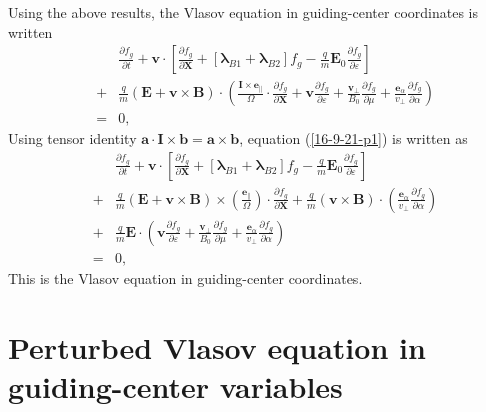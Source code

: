 \documentclass{llncs}
\newcommand{\tmmathbf}[1]{\ensuremath{\boldsymbol{#1}}}
\begin{document}
Using the above results, the Vlasov equation in guiding-center coordinates is
written
\begin{eqnarray}
  &  & \frac{\partial f_g}{\partial t} +\mathbf{v} \cdot \left[
  \frac{\partial f_g}{\partial \mathbf{X}} + [\tmmathbf{\lambda}_{B 1}
  +\tmmathbf{\lambda}_{B 2}] f_g - \frac{q}{m} \mathbf{E}_0 \frac{\partial
  f_g}{\partial \varepsilon} \right] \nonumber\\
  & + & \frac{q}{m} (\mathbf{E}+\mathbf{v} \times \mathbf{B}) \cdot \left(
  \frac{\mathbf{I} \times \tmmathbf{e}_{\parallel}}{\Omega} \cdot
  \frac{\partial f_g}{\partial \mathbf{X}} + \tmmathbf{v} \frac{\partial
  f_g}{\partial \varepsilon} + \frac{\tmmathbf{v}_{\perp}}{B_0} 
  \frac{\partial f_g}{\partial \mu} + \frac{\tmmathbf{e}_{\alpha}}{v_{\perp}} 
  \frac{\partial f_g}{\partial \alpha} \right) \nonumber\\
  & = & 0,  \label{16-9-21-p1}
\end{eqnarray}
Using tensor identity $\mathbf{a} \cdot \tmmathbf{I} \times
\mathbf{b}=\mathbf{a} \times \mathbf{b}$, equation (\ref{16-9-21-p1}) is
written as
\begin{eqnarray}
  &  & \frac{\partial f_g}{\partial t} +\mathbf{v} \cdot \left[
  \frac{\partial f_g}{\partial \mathbf{X}} + [\tmmathbf{\lambda}_{B 1}
  +\tmmathbf{\lambda}_{B 2}] f_g - \frac{q}{m} \mathbf{E}_0 \frac{\partial
  f_g}{\partial \varepsilon} \right] \nonumber\\
  & + & \frac{q}{m} (\mathbf{E}+\mathbf{v} \times \mathbf{B}) \times \left(
  \frac{\tmmathbf{e}_{\parallel}}{\Omega}  \right) \cdot \frac{\partial
  f_g}{\partial \mathbf{X}} + \frac{q}{m} (\mathbf{v} \times \mathbf{B}) \cdot
  \left( \frac{\tmmathbf{e}_{\alpha}}{v_{\perp}}  \frac{\partial f_g}{\partial
  \alpha} \right) \nonumber\\
  & + & \frac{q}{m} \mathbf{E} \cdot \left( \mathbf{v} \frac{\partial
  f_g}{\partial \varepsilon} + \frac{\mathbf{v}_{\perp}}{B_0}  \frac{\partial
  f_g}{\partial \mu} + \frac{\tmmathbf{e}_{\alpha}}{v_{\perp}}  \frac{\partial
  f_g}{\partial \alpha} \right) \nonumber\\
  & = & 0,  \label{16-10-2-p1}
\end{eqnarray}
This is the Vlasov equation in guiding-center coordinates.

\section{Perturbed Vlasov equation in guiding-center variables}
\end{document}
